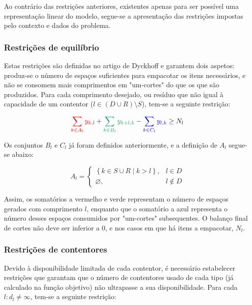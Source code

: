 \documentclass[12pt, a4paper, titlepage]{article}
\begin{document}
Ao contrário das restrições anteriores, existentes apenas para ser possível uma representação linear
do modelo, segue-se a apresentação das restrições impostas pelo contexto e dados do problema.

\subsubsection{Restrições de equilíbrio}

Estas restrições são definidas no artigo de Dyckhoff \cite{dyckhoff} e garantem dois aspetos:
produz-se o número de espaços suficientes para empacotar os itens necessários, e não se consomem
mais comprimentos em "um-cortes"{} do que os que são produzidos. Para cada comprimento desejado, ou
resíduo que não igual à capacidade de um contentor ($l \in (D \cup R) \setminus S$), tem-se a
seguinte restrição:

\begin{equation}
    {\color{red} \sum_{k \in A_l} y_{k, l}} +
    {\color{ForestGreen} \sum_{k \in B_l} y_{k + l, k}} -
    {\color{blue} \sum_{k \in C_l} y_{l, k}} \geq N_l
    \label{eq:balance-restriction}
\end{equation}

Os conjuntos $B_l$ e $C_l$ já foram definidos anteriormente, e a definição de $A_l$ segue-se abaixo:

\begin{equation}
    A_l =
    \begin{cases}
        \left \{ k \in S \cup R \mid k > l \right \}, & l \in D \\
        \varnothing, & l \not \in D
    \end{cases}
    \nonumber
\end{equation}

Assim, os somatórios a {\color{red} vermelho} e {\color{ForestGreen} verde} representam o número de
espaços gerados com comprimento $l$, enquanto que o somatório a {\color{blue} azul} representa o
número desses espaços consumidos por "um-cortes"{} subsequentes. O balanço final de cortes não deve
ser inferior a $0$, e nos casos em que há itens a empacotar, $N_l$.

\subsubsection{Restrições de contentores}

Devido à disponibilidade limitada de cada contentor, é necessário estabelecer restrições que
garantam que o número de contentores usado de cada tipo (já calculado na função objetivo) não
ultrapasse a sua disponibilidade. Para cada $l: d_l \not = \infty$, tem-se a seguinte restrição:
\end{document}
